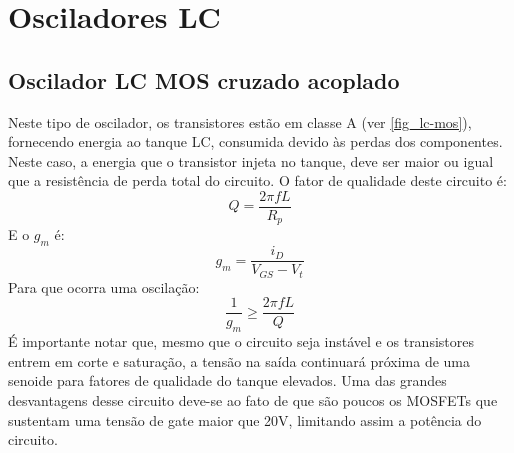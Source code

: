 \chapter{Osciladores LC}
\label{osciladores-lc}
\section{Oscilador LC MOS cruzado acoplado}
Neste tipo de oscilador, os transistores estão em classe A (ver \autoref{fig_lc-mos}), fornecendo energia ao tanque LC, consumida devido às perdas dos componentes. Neste caso, a energia que o transistor injeta no tanque, deve ser maior ou igual que a resistência de perda total do circuito. O fator de qualidade deste circuito é:
\begin{equation}
Q = \frac{2\pi f L}{R_p}
\end{equation}
E o $g_m$ é:
\begin{equation}
g_m = \frac{i_D}{V_{GS} - V_t}
\end{equation}
Para que ocorra uma oscilação:
\begin{equation}
\frac{1}{g_m} \geq \frac{2\pi f L}{Q}
\end{equation}
É importante notar que, mesmo que o circuito seja instável e os transistores entrem em corte e saturação, a tensão na saída continuará próxima de uma senoide para fatores de qualidade do tanque elevados.
Uma das grandes desvantagens desse circuito deve-se ao fato de que são poucos os MOSFETs que sustentam uma tensão de gate maior que 20V, limitando assim a potência do circuito.

